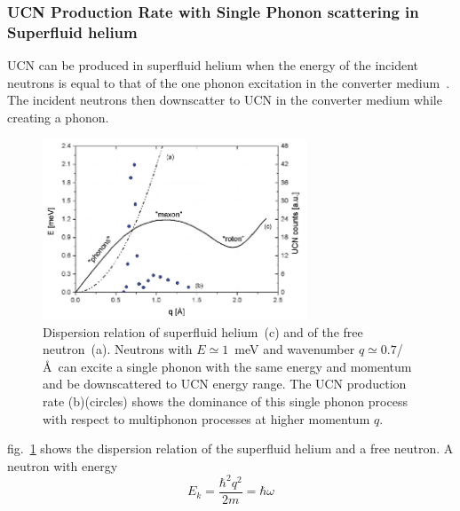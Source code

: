 \subsubsection{UCN Production Rate with Single Phonon scattering in
  Superfluid
  helium\label{sec:UCN_production}}
UCN can be produced in superfluid helium when the energy of the
incident neutrons is equal to that of the one phonon excitation in the
converter medium~\cite{Korobkina2002,Schmidt2009,Golub77}. The
incident neutrons then downscatter to UCN in the converter medium
while creating a phonon.
\begin{figure}[h!]
\begin{center}
   \includegraphics[width=0.7\textwidth]{FIG1_2.PNG}
   \caption[Free neutron and superfluid helium dispersion
   relation]{\cite{PSI_news} Dispersion relation of superfluid
     helium~(c) and of the free neutron~(a). Neutrons with
     $E\simeq 1$~meV and wavenumber $q \simeq 0.7$/\AA~can excite a
     single phonon with the same energy and momentum and be
     downscattered to UCN energy range. The UCN production rate
     (b)(circles) shows the dominance of this single phonon process
     with respect to multiphonon processes at higher momentum $q$.
    }
    \label{fig:FIG1}
    \end{center}
\end{figure} 
fig.~\ref{fig:FIG1} shows the dispersion relation of the superfluid
helium and a free neutron. A neutron with energy
\begin{equation}
  \label{eqn:neutron_energy}
  E_k = \frac{\hbar^2 q^2}{2 m} = \hbar \omega
\end{equation}
